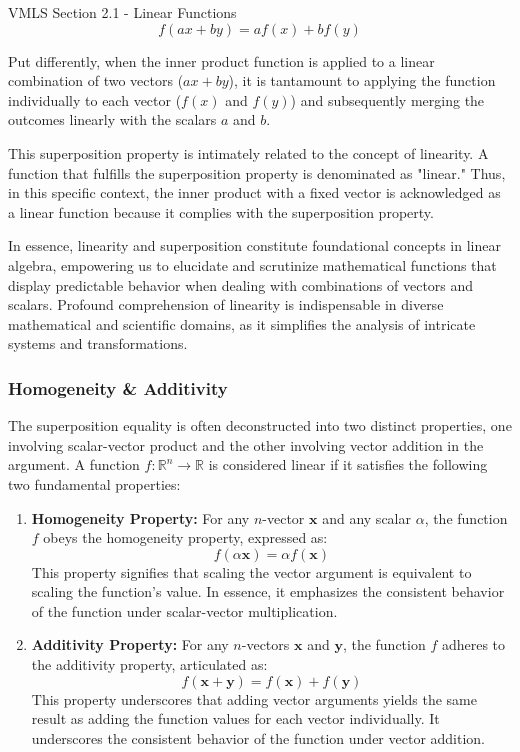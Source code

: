 \begin{notes}{VMLS Section 2.1 - Linear Functions}
    \begin{equation*}
        f(ax + by) = af(x) + bf(y)
    \end{equation*}
    
    Put differently, when the inner product function is applied to a linear combination of two vectors (\(ax + by\)), it is tantamount to applying the function individually to each vector (\(f(x)\) and \(f(y)\)) and 
    subsequently merging the outcomes linearly with the scalars \(a\) and \(b\).
    
    This superposition property is intimately related to the concept of linearity. A function that fulfills the superposition property is denominated as "linear." Thus, in this specific context, the inner product with 
    a fixed vector is acknowledged as a linear function because it complies with the superposition property.
    
    In essence, linearity and superposition constitute foundational concepts in linear algebra, empowering us to elucidate and scrutinize mathematical functions that display predictable behavior when dealing with 
    combinations of vectors and scalars. Profound comprehension of linearity is indispensable in diverse mathematical and scientific domains, as it simplifies the analysis of intricate systems and transformations.

    \subsubsection*{Homogeneity \& Additivity}

    The superposition equality is often deconstructed into two distinct properties, one involving scalar-vector product and the other involving vector addition in the argument. A function \(f : \mathbb{R}^n 
    \rightarrow \mathbb{R}\) is considered linear if it satisfies the following two fundamental properties:
    
    \begin{enumerate}
        \item \textbf{Homogeneity Property:} For any \(n\)-vector \(\mathbf{x}\) and any scalar \(\alpha\), the function \(f\) obeys the homogeneity property, expressed as:
        \[f(\alpha\mathbf{x}) = \alpha f(\mathbf{x})\]
        This property signifies that scaling the vector argument is equivalent to scaling the function's value. In essence, it emphasizes the consistent behavior of the function under scalar-vector multiplication.
        
        \item \textbf{Additivity Property:} For any \(n\)-vectors \(\mathbf{x}\) and \(\mathbf{y}\), the function \(f\) adheres to the additivity property, articulated as:
        \[f(\mathbf{x} + \mathbf{y}) = f(\mathbf{x}) + f(\mathbf{y})\]
        This property underscores that adding vector arguments yields the same result as adding the function values for each vector individually. It underscores the consistent behavior of the function under vector addition.
    \end{enumerate}
    

\end{notes}
